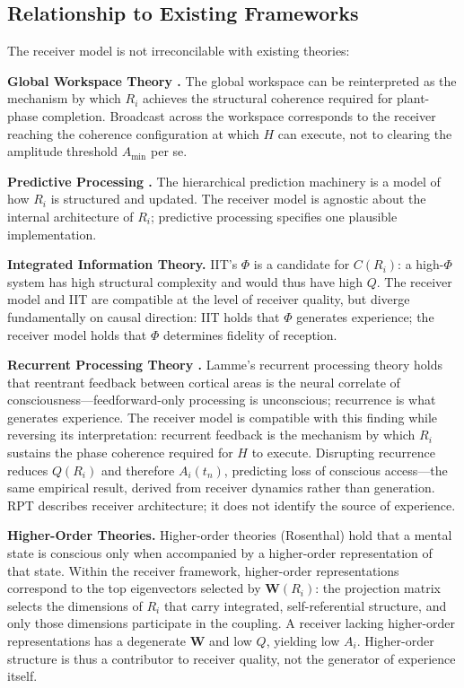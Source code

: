 \documentclass[12pt]{article}
\begin{document}
\subsection{Relationship to Existing Frameworks}

The receiver model is not irreconcilable with existing theories:

\textbf{Global Workspace Theory \cite{baars1988}.} The global workspace can be reinterpreted as the mechanism by which $R_i$ achieves the structural coherence required for plant-phase completion. Broadcast across the workspace corresponds to the receiver reaching the coherence configuration at which $H$ can execute, not to clearing the amplitude threshold $A_{\min}$ per se.

\textbf{Predictive Processing \cite{clark2016}.} The hierarchical prediction machinery is a model of how $R_i$ is structured and updated. The receiver model is agnostic about the internal architecture of $R_i$; predictive processing specifies one plausible implementation.

\textbf{Integrated Information Theory.} IIT's $\Phi$ is a candidate for $C(R_i)$: a high-$\Phi$ system has high structural complexity and would thus have high $Q$. The receiver model and IIT are compatible at the level of receiver quality, but diverge fundamentally on causal direction: IIT holds that $\Phi$ generates experience; the receiver model holds that $\Phi$ determines fidelity of reception.

\textbf{Recurrent Processing Theory \cite{crick1990,engel2001}.} Lamme's recurrent processing theory holds that reentrant feedback between cortical areas is the neural correlate of consciousness---feedforward-only processing is unconscious; recurrence is what generates experience. The receiver model is compatible with this finding while reversing its interpretation: recurrent feedback is the mechanism by which $R_i$ sustains the phase coherence required for $H$ to execute. Disrupting recurrence reduces $Q(R_i)$ and therefore $A_i(t_n)$, predicting loss of conscious access---the same empirical result, derived from receiver dynamics rather than generation. RPT describes receiver architecture; it does not identify the source of experience.

\textbf{Higher-Order Theories.} Higher-order theories (Rosenthal) hold that a mental state is conscious only when accompanied by a higher-order representation of that state. Within the receiver framework, higher-order representations correspond to the top eigenvectors selected by $\mathbf{W}(R_i)$: the projection matrix selects the dimensions of $R_i$ that carry integrated, self-referential structure, and only those dimensions participate in the coupling. A receiver lacking higher-order representations has a degenerate $\mathbf{W}$ and low $Q$, yielding low $A_i$. Higher-order structure is thus a contributor to receiver quality, not the generator of experience itself.
\end{document}
